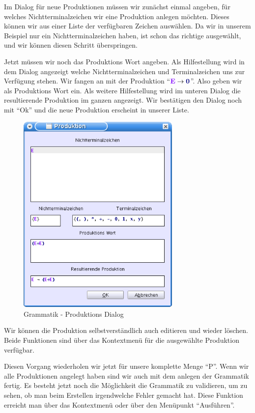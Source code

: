 Im Dialog für neue Produktionen müssen wir zunächst einmal angeben, für welches
Nichtterminalzeichen wir eine Produktion anlegen möchten. Dieses können wir aus
einer Liste der verfügbaren Zeichen auswählen. Da wir in unserem Beispiel nur
ein Nichtterminalzeichen haben, ist schon das richtige ausgewählt, und wir
können diesen Schritt überspringen.\vspace{10pt}

Jetzt müssen wir noch das Produktions Wort angeben. Als Hilfestellung wird in
dem Dialog angezeigt welche Nichtterminalzeichen und Terminalzeichen uns zur
Verfügung stehen. Wir fangen an mit der Produktion "`$\StartSymbol{E} \to
\TerminalSymbol{0}$"'. Also geben wir als Produktions Wort 
ein. Als weitere Hilfestellung wird im unteren Dialog die resultierende Produktion im ganzen angezeigt. Wir bestätigen den
Dialog noch mit "`Ok"' und die neue Produktion erscheint in unserer Liste.\vspace{10pt}

\begin{figure}[h]
\begin{center}
\includegraphics[width=8cm]{images/production_dialog.png}
\caption{Grammatik - Produktions Dialog}
\end{center}
\end{figure}

Wir können die Produktion selbstverständlich auch editieren und wieder löschen.
Beide Funktionen sind über das Kontextmenü für die ausgewählte Produktion
verfügbar.\vspace{10pt}

Diesen Vorgang wiederholen wir jetzt für unsere komplette Menge "`P"'. Wenn wir
alle Produktionen angelegt haben sind wir auch mit dem anlegen der Grammatik
fertig. Es besteht jetzt noch die Möglichkeit die Grammatik zu validieren, um
zu sehen, ob man beim Erstellen irgendwelche Fehler gemacht hat. Diese Funktion
erreicht man über das Kontextmenü oder über den Menüpunkt "`Ausführen"'.

